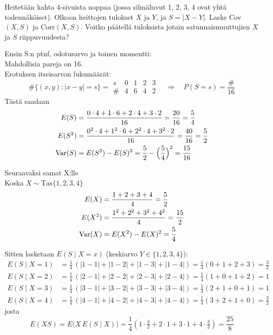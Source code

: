 \documentclass[12pt,a4paper]{article}
\begin{document}
\pagebreak

Heitetään kahta 4-sivuista noppaa (jossa silmäluvut 1, 2, 3, 4 ovat yhtä todennäköiset).
Olkoon heittojen tulokset $X$ ja $Y$, ja $S=|X-Y|$. Laske Cov$(X,S)$ ja Corr$(X,S)$. Voitko päätellä tuloksista jotain satunnaismuuttujien $X$ ja $S$ riippuvuudesta?

\vspace{0.4cm}


Ensin S:n ptnf, odotusarvo ja toinen momentti:\\
Mahdollisia pareja on 16. \\

Erotuksen itseisarvon lukumäärät:
\[
\#\{(x,y):|x-y|=s\}=
\begin{array}{c|cccc}
s&0&1&2&3\\\hline
\#&4&6&4&2
\end{array}
\quad\Rightarrow\quad
P(S=s)=\frac{\#}{16}
\]
Tästä saadaan
\[
\begin{aligned}
E(S)&=\frac{0\cdot4+1\cdot6+2\cdot4+3\cdot2}{16}=\frac{20}{16}=\frac54\\
E(S^2)&=\frac{0^2\cdot4+1^2\cdot6+2^2\cdot4+3^2\cdot2}{16}=\frac{40}{16}=\frac52\\
\operatorname{Var}(S)&=E(S^2)-E(S)^2=\frac52-\Big(\frac54\Big)^2=\frac{15}{16}
\end{aligned}
\]

\vspace{0.4cm}

Seuraavaksi samat X:lle\\
Koska $X\sim\mathrm{Tas}\{1,2,3,4\}$
\[
\begin{aligned}
E(X)&=\frac{1+2+3+4}{4}=\frac52\\
E(X^2)&=\frac{1^2+2^2+3^2+4^2}{4}=\frac{15}{2}\\
\operatorname{Var}(X)&=E(X^2)-E(X)^2=\frac{5}{4}
\end{aligned}
\]
\vspace{0.4cm}

Sitten lasketaan $E(S\mid X=x)$ (keskiarvo $Y\in\{1,2,3,4\}$):
\[
\begin{aligned}
E(S\mid X=1)&=\frac14\,(|1-1|+|1-2|+|1-3|+|1-4|)=\frac14(0+1+2+3)=\tfrac32\\
E(S\mid X=2)&=\frac14\,(|2-1|+|2-2|+|2-3|+|2-4|)=\frac14(1+0+1+2)=1\\
E(S\mid X=3)&=\frac14\,(|3-1|+|3-2|+|3-3|+|3-4|)=\frac14(2+1+0+1)=1\\
E(S\mid X=4)&=\frac14\,(|4-1|+|4-2|+|4-3|+|4-4|)=\frac14(3+2+1+0)=\tfrac32
\end{aligned}
\]
josta
\[
E(XS)=E\big(X\,E(S\mid X)\big)
=\frac14\!\left(1\cdot\tfrac32+2\cdot 1+3\cdot 1+4\cdot\tfrac32\right)
=\frac{25}{8}
\]
\end{document}
